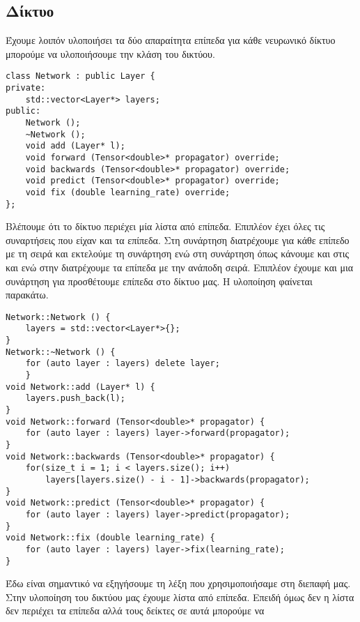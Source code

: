 \subsection{Δίκτυο}
\sloppy
Έχουμε λοιπόν υλοποιήσει τα δύο απαραίτητα επίπεδα για κάθε νευρωνικό δίκτυο μπορούμε να υλοποιήσουμε την κλάση του δικτύου.
\fussy
\begin{otherlanguage}{english}
\begin{lstlisting}[style=cppstyle,caption= Network layer in hpp file]
class Network : public Layer {
private:
    std::vector<Layer*> layers;
public:
    Network ();
    ~Network ();
    void add (Layer* l);
    void forward (Tensor<double>* propagator) override;
    void backwards (Tensor<double>* propagator) override;
    void predict (Tensor<double>* propagator) override;
    void fix (double learning_rate) override;
};
\end{lstlisting}
\end{otherlanguage}
Βλέπουμε ότι το δίκτυο περιέχει μία λίστα από επίπεδα. Επιπλέον έχει όλες τις συναρτήσεις που είχαν και τα επίπεδα. Στη συνάρτηση  διατρέχουμε για κάθε επίπεδο με τη σειρά και εκτελούμε τη συνάρτηση  ενώ στη συνάρτηση
όπως κάνουμε και στις  και  ενώ στην  διατρέχουμε τα επίπεδα με την ανάποδη σειρά. Επιπλέον έχουμε και μια συνάρτηση για προσθέτουμε επίπεδα στο δίκτυο μας. Η υλοποίηση φαίνεται παρακάτω.
\begin{otherlanguage}{english}
\begin{lstlisting}[style=cppstyle,caption= Network layer in cpp file, xleftmargin=-0.5cm, xrightmargin=-0.5cm]
Network::Network () {
    layers = std::vector<Layer*>{};
}
Network::~Network () {
    for (auto layer : layers) delete layer;
    }
void Network::add (Layer* l) {
    layers.push_back(l);
}
void Network::forward (Tensor<double>* propagator) {
    for (auto layer : layers) layer->forward(propagator);
}
void Network::backwards (Tensor<double>* propagator) {
    for(size_t i = 1; i < layers.size(); i++)
        layers[layers.size() - i - 1]->backwards(propagator);
}
void Network::predict (Tensor<double>* propagator) {
    for (auto layer : layers) layer->predict(propagator);
}
void Network::fix (double learning_rate) {
    for (auto layer : layers) layer->fix(learning_rate);
}
\end{lstlisting}
\end{otherlanguage}
Έδω είναι σημαντικό να εξηγήσουμε τη λέξη  που χρησιμοποιήσαμε στη διεπαφή μας. Στην υλοποίηση του δικτύου μας έχουμε λίστα από επίπεδα. Επειδή όμως δεν η λίστα δεν περιέχει τα επίπεδα αλλά τους δείκτες σε αυτά μπορούμε να
